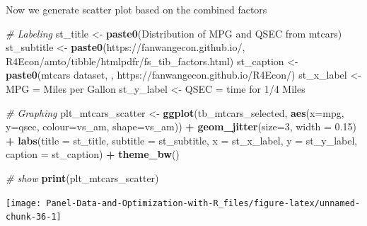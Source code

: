 \documentclass[
]{book}
\newenvironment{Shaded}{\begin{snugshade}}{\end{snugshade}}
\newcommand{\CommentTok}[1]{\textcolor[rgb]{0.56,0.35,0.01}{\textit{#1}}}
\newcommand{\DataTypeTok}[1]{\textcolor[rgb]{0.13,0.29,0.53}{#1}}
\newcommand{\DecValTok}[1]{\textcolor[rgb]{0.00,0.00,0.81}{#1}}
\newcommand{\FloatTok}[1]{\textcolor[rgb]{0.00,0.00,0.81}{#1}}
\newcommand{\KeywordTok}[1]{\textcolor[rgb]{0.13,0.29,0.53}{\textbf{#1}}}
\newcommand{\NormalTok}[1]{#1}
\newcommand{\OperatorTok}[1]{\textcolor[rgb]{0.81,0.36,0.00}{\textbf{#1}}}
\newcommand{\StringTok}[1]{\textcolor[rgb]{0.31,0.60,0.02}{#1}}
\begin{document}
Now we generate scatter plot based on the combined factors

\begin{Shaded}
\begin{Highlighting}[]
\CommentTok{\# Labeling}
\NormalTok{st\_title \textless{}{-}}\StringTok{ }\KeywordTok{paste0}\NormalTok{(}\StringTok{\textquotesingle{}Distribution of MPG and QSEC from mtcars\textquotesingle{}}\NormalTok{)}
\NormalTok{st\_subtitle \textless{}{-}}\StringTok{ }\KeywordTok{paste0}\NormalTok{(}\StringTok{\textquotesingle{}https://fanwangecon.github.io/\textquotesingle{}}\NormalTok{,}
                      \StringTok{\textquotesingle{}R4Econ/amto/tibble/htmlpdfr/fs\_tib\_factors.html\textquotesingle{}}\NormalTok{)}
\NormalTok{st\_caption \textless{}{-}}\StringTok{ }\KeywordTok{paste0}\NormalTok{(}\StringTok{\textquotesingle{}mtcars dataset, \textquotesingle{}}\NormalTok{,}
                     \StringTok{\textquotesingle{}https://fanwangecon.github.io/R4Econ/\textquotesingle{}}\NormalTok{)}
\NormalTok{st\_x\_label \textless{}{-}}\StringTok{ \textquotesingle{}MPG = Miles per Gallon\textquotesingle{}}
\NormalTok{st\_y\_label \textless{}{-}}\StringTok{ \textquotesingle{}QSEC = time for 1/4 Miles\textquotesingle{}}

\CommentTok{\# Graphing}
\NormalTok{plt\_mtcars\_scatter \textless{}{-}}\StringTok{ }
\StringTok{  }\KeywordTok{ggplot}\NormalTok{(tb\_mtcars\_selected, }
         \KeywordTok{aes}\NormalTok{(}\DataTypeTok{x=}\NormalTok{mpg, }\DataTypeTok{y=}\NormalTok{qsec, }\DataTypeTok{colour=}\NormalTok{vs\_am, }\DataTypeTok{shape=}\NormalTok{vs\_am)) }\OperatorTok{+}
\StringTok{  }\KeywordTok{geom\_jitter}\NormalTok{(}\DataTypeTok{size=}\DecValTok{3}\NormalTok{, }\DataTypeTok{width =} \FloatTok{0.15}\NormalTok{) }\OperatorTok{+}
\StringTok{  }\KeywordTok{labs}\NormalTok{(}\DataTypeTok{title =}\NormalTok{ st\_title, }\DataTypeTok{subtitle =}\NormalTok{ st\_subtitle,}
       \DataTypeTok{x =}\NormalTok{ st\_x\_label, }\DataTypeTok{y =}\NormalTok{ st\_y\_label, }\DataTypeTok{caption =}\NormalTok{ st\_caption) }\OperatorTok{+}
\StringTok{  }\KeywordTok{theme\_bw}\NormalTok{()}

\CommentTok{\# show}
\KeywordTok{print}\NormalTok{(plt\_mtcars\_scatter)}
\end{Highlighting}
\end{Shaded}

\begin{center}\texttt{[image: Panel-Data-and-Optimization-with-R\_files/figure-latex/unnamed-chunk-36-1]} \end{center}
\end{document}
